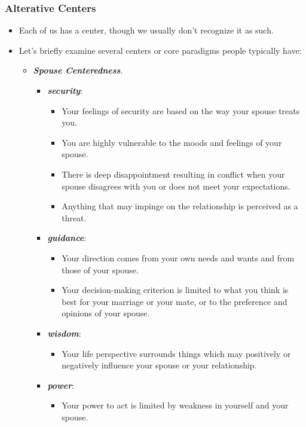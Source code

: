 \documentclass[11pt]{article}
\begin{document}
\subsubsection{Alterative Centers}
\begin{itemize}
\item Each of us has a center, though we usually don't recognize it as such.

\item Let's briefly examine several centers or core paradigms people typically have:
\begin{itemize}
\item \emph{\textbf{Spouse Centeredness}}.
\begin{itemize}
\item \emph{\textbf{security}}: 
\begin{itemize}
\item Your feelings of security are based on the way your spouse treats you.
\item You are highly vulnerable to the moods and feelings of your spouse.
\item There is deep disappointment resulting in conflict when your spouse disagrees with you or does not meet your expectations.
\item Anything that may impinge on the relationship is perceived as a threat. 
\end{itemize}
  
\item \emph{\textbf{guidance}}:
\begin{itemize}
\item Your direction comes from your own needs and wants and from those of your spouse.
\item Your decision-making criterion is limited to what you think is best for your marriage or your mate, or to the preference and opinions of your spouse.
\end{itemize}
  
\item \emph{\textbf{wisdom}}:
\begin{itemize}
\item Your life perspective surrounds things which may positively or negatively influence your spouse or your relationship.
\end{itemize}

\item \emph{\textbf{power}}:
\begin{itemize}
\item Your power to act is limited by weakness in yourself and your spouse.
\end{itemize}
\end{itemize}


\end{itemize}
\end{itemize}
\end{document}
